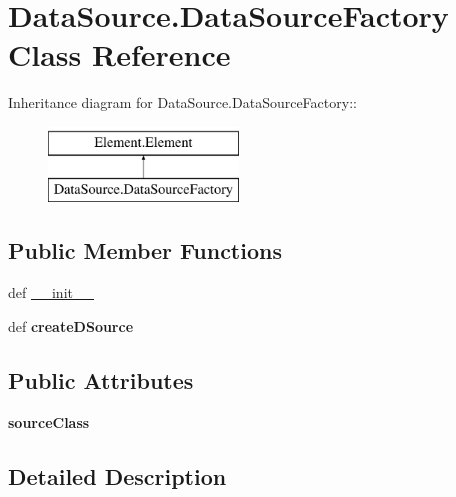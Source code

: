 \hypertarget{classDataSource_1_1DataSourceFactory}{
\section{DataSource.DataSourceFactory Class Reference}
\label{classDataSource_1_1DataSourceFactory}
}
Inheritance diagram for DataSource.DataSourceFactory::\begin{figure}[H]
\begin{center}
\leavevmode
\includegraphics[height=2cm]{classDataSource_1_1DataSourceFactory}
\end{center}
\end{figure}
\subsection*{Public Member Functions}
\begin{DoxyCompactItemize}
\item 
def \hyperlink{classDataSource_1_1DataSourceFactory_a9cfa373f259e0f9b21c9f1624fb7b517}{\_\-\_\-init\_\-\_\-}
\item 
\hypertarget{classDataSource_1_1DataSourceFactory_ac5399da5c150c5d766109dbd44670268}{
def {\bfseries createDSource}}
\label{classDataSource_1_1DataSourceFactory_ac5399da5c150c5d766109dbd44670268}

\end{DoxyCompactItemize}
\subsection*{Public Attributes}
\begin{DoxyCompactItemize}
\item 
\hypertarget{classDataSource_1_1DataSourceFactory_a95e0b3880f697952f85f9ec529e20396}{
{\bfseries sourceClass}}
\label{classDataSource_1_1DataSourceFactory_a95e0b3880f697952f85f9ec529e20396}

\end{DoxyCompactItemize}


\subsection{Detailed Description}


